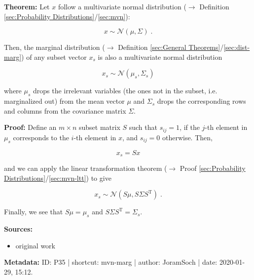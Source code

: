 \documentclass[a4paper,12pt,twoside]{book}
\begin{document}
\textbf{Theorem:} Let $x$ follow a multivariate normal distribution ($\rightarrow$ Definition \ref{sec:Probability Distributions}/\ref{sec:mvn}):

\begin{equation} \label{eq:mvn-marg-mvn}
x \sim \mathcal{N}(\mu, \Sigma) \; .
\end{equation}

Then, the marginal distribution ($\rightarrow$ Definition \ref{sec:General Theorems}/\ref{sec:dist-marg}) of any subset vector $x_s$ is also a multivariate normal distribution

\begin{equation} \label{eq:mvn-marg-mvn-marg}
x_s \sim \mathcal{N}(\mu_s, \Sigma_s)
\end{equation}

where $\mu_s$ drops the irrelevant variables (the ones not in the subset, i.e. marginalized out) from the mean vector $\mu$ and $\Sigma_s$ drops the corresponding rows and columns from the covariance matrix $\Sigma$.


\vspace{1em}
\textbf{Proof:} Define an $m \times n$ subset matrix $S$ such that $s_{ij} = 1$, if the $j$-th element in $\mu_s$ corresponds to the $i$-th element in $x$, and $s_{ij} = 0$ otherwise. Then,

\begin{equation} \label{eq:mvn-marg-xs}
x_s = S x
\end{equation}

and we can apply the linear transformation theorem ($\rightarrow$ Proof \ref{sec:Probability Distributions}/\ref{sec:mvn-ltt}) to give

\begin{equation} \label{eq:mvn-marg-mvn-marg-qed}
x_s \sim \mathcal{N}(S \mu, S \Sigma S^\mathrm{T}) \; .
\end{equation}

Finally, we see that $S \mu = \mu_s$ and $S \Sigma S^\mathrm{T} = \Sigma_s$.


\vspace{1em}
\textbf{Sources:}
\begin{itemize}
\item original work\end{itemize}


\vspace{1em}
\textbf{Metadata:} ID: P35 | shortcut: mvn-marg | author: JoramSoch | date: 2020-01-29, 15:12.
\vspace{1em}
\end{document}
